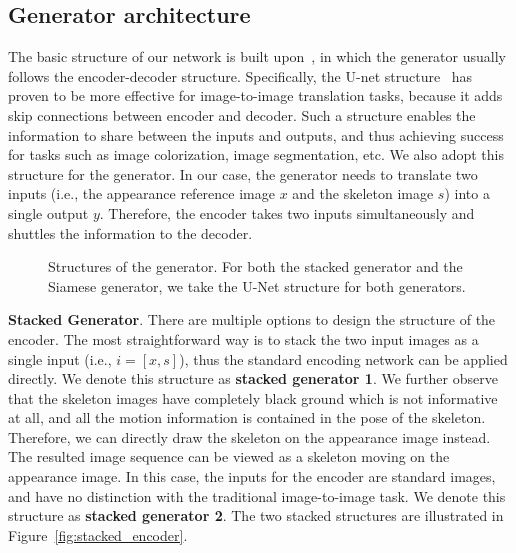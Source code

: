 \documentclass[journal]{IEEEtran}
\begin{document}
\subsection{Generator architecture}
The basic structure of our network is built upon~\cite{DBLP:journals/corr/IsolaZZE16}, in which the generator usually follows the encoder-decoder structure. Specifically, the U-net structure~\cite{DBLP:conf/miccai/RonnebergerFB15} has proven to be more effective for image-to-image translation tasks, because it adds skip connections between encoder and decoder. Such a structure enables the information to share between the inputs and outputs, and thus achieving success for tasks such as image colorization, image segmentation, etc.
We also adopt this structure for the generator. In our case, the generator needs to translate two inputs (i.e., the appearance reference image $x$ and the skeleton image $s$) into a single output $y$. Therefore, the encoder takes two inputs simultaneously and shuttles the information to the decoder.
\begin{figure}
\centering
{}
\hspace{.01in}
\caption{Structures of the generator. For both the stacked generator and the Siamese generator, we take the U-Net structure for both generators. }
\label{fig:encoder}
\end{figure}

\textbf{Stacked Generator}. There are multiple options to design the structure of the encoder. The most straightforward way is to stack the two input images as a single input (i.e., $i = [x,s]$), thus the standard encoding network can be applied directly. We denote this structure as \textbf{stacked generator 1}. We further observe that the skeleton images have completely black ground which is not informative at all, and all the motion information is contained in the pose of the skeleton. Therefore, we can directly draw the skeleton on the appearance image instead. The resulted image sequence can be viewed as a skeleton moving on the appearance image. In this case, the inputs for the encoder are standard images, and have no distinction with the traditional image-to-image task. We denote this structure as \textbf{stacked generator 2}. The two stacked structures are illustrated in Figure~\ref{fig:stacked_encoder}.
\end{document}
